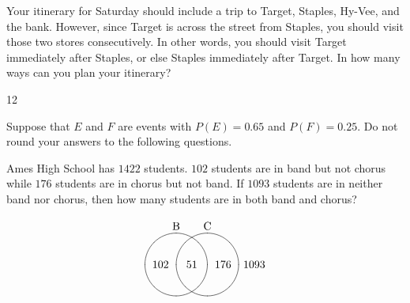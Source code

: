 \documentclass[addpoints,12pt]{exam}
\begin{document}
\begin{questions}
\question[16] Your itinerary for Saturday should
include a trip to Target, Staples, Hy-Vee, and the bank.
However, since Target is across the street from Staples,
you should visit those two stores consecutively. In other
words, you should visit Target immediately after Staples, or else
Staples immediately after Target. In how many ways
can you plan your itinerary?
\begin{solution}[4in]12\end{solution}

\question[15] Suppose that $E$ and $F$ are events
with $P\left(E\right)=0.65$ and $P\left(F\right)=0.25$.
Do not round your answers to the following questions.
\ifprintanswers\else\newpage\fi

\question[18] Ames High School has $1422$ students.
$102$ students are in band but not chorus while
$176$ students are in chorus but not band.
If $1093$ students are in neither band nor chorus,
then how many students are in both band and chorus?
\begin{solution}[4in]
\[\begin{xy}<.5cm,0cm>:
(-1,2)*+!D{\text{B}};
(1,2)*+!D{\text{C}};
(-1,0)*\cir<1cm>{};
(1,0)*\cir<1cm>{};
(0,0)*{51};
(-2,0)*{102};
(2,0)*{176};
(4,0)*{1093};
\end{xy}\]
\end{solution}

\end{questions}

\vfill\ifprintanswers\else
\begin{center}\gradetable[h][questions]\end{center}\fi
\end{document}
